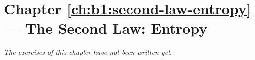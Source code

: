 \section*{Chapter \ref{ch:b1:second-law-entropy} --- The Second Law: Entropy}


\emph{The exercises of this chapter have not been written yet.}

